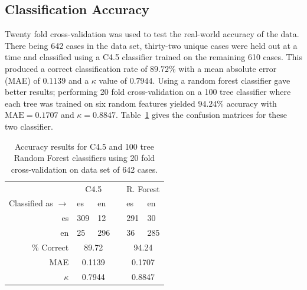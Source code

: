 \documentclass[main.tex]{subfiles}
\begin{document}
\subsection{Classification Accuracy}

Twenty fold cross-validation was used to test the real-world accuracy of the data. There being 642 cases in the data set, thirty-two unique cases were held out at a time and classified using a C4.5 classifier trained on the remaining 610 cases. This produced a correct classification rate of $89.72\%$ with a mean absolute error (MAE) of $0.1139$ and a $\kappa$ value of $0.7944$. Using a random forest classifier gave better results; performing 20 fold cross-validation on a 100 tree classifier where each tree was trained on six random features yielded $94.24\%$ accuracy with $\text{MAE} = 0.1707$ and $\kappa = 0.8847$. Table~\ref{table:dep-results} gives the confusion matrices for these two classifier.

\begin{table}
\centering
\caption{Accuracy results for C4.5 and 100 tree Random Forest classifiers using 20 fold cross-validation on data set of 642 cases.}
\begin{tabular}{r l l l l l}
\toprule
&\multicolumn{2}{c}{C4.5}& & \multicolumn{2}{c}{R. Forest}\\
\cmidrule{2-3} \cmidrule{5-6}
Classified as $\rightarrow$ & es & en && es & en\\
es &309 & 12 && 291 & 30 \\
en &25 & 296 && 36 & 285 \\
\cmidrule{2-3} \cmidrule{5-6}
\% Correct & \multicolumn{2}{c}{89.72} && \multicolumn{2}{c}{94.24} \\
MAE & \multicolumn{2}{c}{0.1139} && \multicolumn{2}{c}{0.1707} \\
$\kappa$ & \multicolumn{2}{c}{0.7944} && \multicolumn{2}{c}{0.8847} \\
\bottomrule
\end{tabular}

\label{table:dep-results}
\end{table}

\biblio
\end{document}
